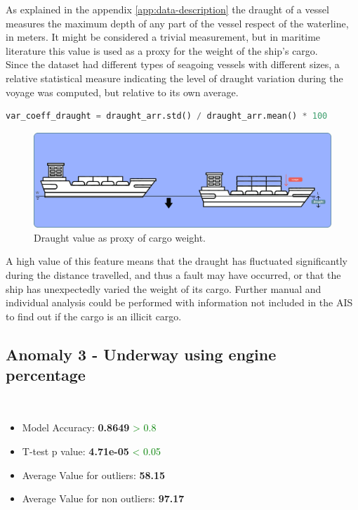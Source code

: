 As explained in the appendix \ref{app:data-description} the draught of a vessel measures the maximum depth of any part of the vessel respect of the waterline, in meters. It might be considered a trivial measurement, but in maritime literature this value is used as a proxy for the weight of the ship's cargo.
\\
Since the dataset had different types of seagoing vessels with different sizes, a relative statistical measure indicating the level of draught variation during the voyage was computed, but relative to its own average.

\begin{lstlisting}[language=Python]
    var_coeff_draught = draught_arr.std() / draught_arr.mean() * 100
\end{lstlisting} 


\begin{figure}[H]
    \centering
    \includegraphics[width=16.5cm]{Images/3/anomaly-2.png}
    \caption{Draught value as proxy of cargo weight.}
\end{figure}

A high value of this feature means that the draught has fluctuated significantly during the distance travelled, and thus a fault may have occurred, or that the ship has unexpectedly varied the weight of its cargo. Further manual and individual analysis could be performed with information not included in the AIS to find out if the cargo is an illicit cargo.

\clearpage
\subsection{Anomaly 3 - Underway using engine percentage}
\label{sec:anomaly-3}

\\

\begin{itemize}
\item Model Accuracy: \textbf{0.8649} \textcolor{green}{> 0.8}
\item T-test p value: \textbf{4.71e-05} \textcolor{green}{< 0.05}
\item Average Value for outliers: \textbf{58.15}
\item Average Value for non outliers: \textbf{97.17}
\end{itemize}
\\

